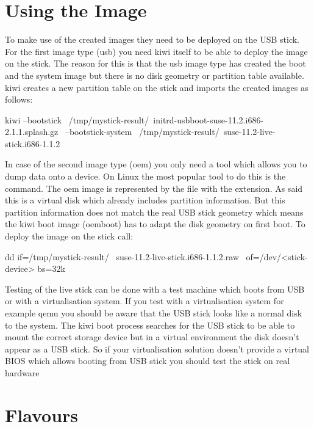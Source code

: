 \section{Using the Image}

To make use of the created images they need to be deployed on the
USB stick. For the first image type (usb) you need kiwi itself to
be able to deploy the image on the stick. The reason for this is
that the usb image type has created the boot and the system image
but there is no disk geometry or partition table available. kiwi
creates a new partition table on the stick and imports the created
images as follows:

\begin{Command}{13cm}
kiwi --bootstick \
   /tmp/mystick-result/\
   initrd-usbboot-suse-11.2.i686-2.1.1.splash.gz \
   --bootstick-system \
   /tmp/mystick-result/\
   suse-11.2-live-stick.i686-1.1.2
\end{Command}

In case of the second image type (oem) you only need a tool which allows
you to dump data onto a device. On Linux the most popular tool to do this
is the \cmd{dd} command. The oem image is represented by the file
with the  extension. As said this is a virtual disk which already
includes partition information. But this partition information does
not match the real USB stick geometry which means the kiwi boot image
(oemboot) has to adapt the disk geometry on first boot. To deploy the
image on the stick call:

\begin{Command}{13cm}
dd if=/tmp/mystick-result/ \
   suse-11.2-live-stick.i686-1.1.2.raw \
   of=/dev/<stick-device> bs=32k
\end{Command}

Testing of the live stick can be done with a test machine which boots from
USB or with a virtualisation system. If you test with a virtualisation
system for example qemu you should be aware that the USB stick looks like
a normal disk to the system. The kiwi boot process searches for the USB
stick to be able to mount the correct storage device but in a virtual
environment the disk doesn't appear as a USB stick. So if your
virtualisation solution doesn't provide a virtual BIOS which allows booting
from USB stick you should test the stick on real hardware

\section{Flavours}

